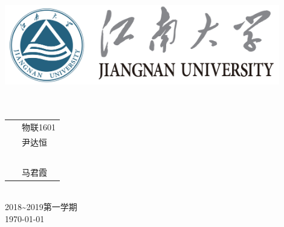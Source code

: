 \documentclass[a4paper]{ctexrep}
\begin{document}
\begin{titlepage}
	\begin{center}
    \includegraphics[width=0.9\textwidth]{figure//Njust.png}\\
    \vspace{10mm}
    \textbf{}\\[0.8cm]
    \textbf{}\\[3cm]
	\vspace{\fill}
	\setlength{\extrarowheight}{3mm}
	{\songti{}	
		\begin{tabular}{rl}
			
			{\makebox[4\ccwd][s]{班\qquad 级：}}& ~\kaishu 物联1601\\
			
			{\makebox[4\ccwd][s]{姓\qquad 名：}}& ~\kaishu 尹达恒 \\ 
			
			{\makebox[4\ccwd][s]{学\qquad 号：}}& ~\kaishu 1030616134 \\ 
			
			{\makebox[4\ccwd][s]{指导老师：}} & ~\kaishu 马君霞\\ 
			
		\end{tabular}
	}\\[2cm]
	\vspace{\fill}
	2018\textasciitilde 2019第一学期\\
	\today
	\end{center}	
\end{titlepage}



\tableofcontents %
\end{document}
